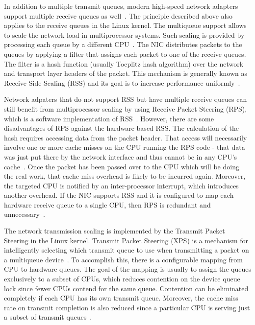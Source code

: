 In addition to multiple transmit queues,
modern high-speed network adapters support multiple receive queues as well~\cite{mellanox-product-brief}.
The principle described above also applies to the receive queues in the Linux kernel.
The multiqueue support allows to scale the network load in multiprocessor systems.
Such scaling is provided by processing each queue by a different CPU~\cite{kernel-doc-scaling}.
The NIC distributes packets to the queues by applying a filter that assigns each packet to one of the receive queues.
The filter is a hash function (usually Toeplitz hash algorithm) over the network and transport layer headers of the packet.
This mechanism is generally known as Receive Side Scaling (RSS)
and its goal is to increase performance uniformly~\cite{kernel-doc-scaling}.

Network adpaters that do not support RSS but have multiple receive queues can still benefit from multiprocessor scaling
by using Receive Packet Steering (RPS), which is a software implementation of RSS~\cite{kernel-doc-scaling}.
However, there are some disadvantages of RPS against the hardware-based RSS.
The calculation of the hash requires accessing data from the packet header.
That access will necessarily involve one or more cache misses on the CPU running the RPS code -
that data was just put there by the network interface and thus cannot be in any CPU's cache~\cite{receive-packet-steering}.
Once the packet has been passed over to the CPU which will be doing the real work,
that cache miss overhead is likely to be incurred again.
Moreover, the targeted CPU is notified by an inter-processor interrupt,
which introduces another overhead.
If the NIC supports RSS and it is configured to map each hardware
receive queue to a single CPU, then RPS is redundant and unnecessary~\cite{kernel-doc-scaling}.

The network transmission scaling is implemented by the
Transmit Packet Steering in the Linux kernel.
Transmit Packet Steering (XPS) is a mechanism for intelligently selecting
which transmit queue to use when transmitting a packet on a multiqueue device~\cite{kernel-source}.
To accomplish this, there is a configurable mapping from CPU to hardware queues.
The goal of the mapping is usually to assign the queues exclusively to a subset of CPUs, which reduces
contention on the device queue lock since fewer CPUs contend for the same queue.
Contention can be eliminated completely if each CPU has its own transmit queue.
Moreover, the cache miss rate on transmit completion is also reduced since a particular CPU
is serving just a subset of transmit queues~\cite{kernel-doc-scaling}.


